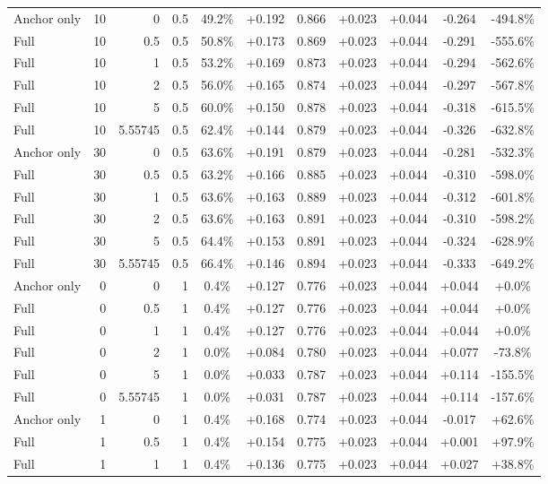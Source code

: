 \begin{table}[htbp]
\begin{tabular}{lrrrccccccc}
Anchor only & 10 & 0 & 0.5 & 49.2\% & +0.192 & 0.866 & +0.023 & +0.044 & -0.264 & -494.8\% \\
Full & 10 & 0.5 & 0.5 & 50.8\% & +0.173 & 0.869 & +0.023 & +0.044 & -0.291 & -555.6\% \\
Full & 10 & 1 & 0.5 & 53.2\% & +0.169 & 0.873 & +0.023 & +0.044 & -0.294 & -562.6\% \\
Full & 10 & 2 & 0.5 & 56.0\% & +0.165 & 0.874 & +0.023 & +0.044 & -0.297 & -567.8\% \\
Full & 10 & 5 & 0.5 & 60.0\% & +0.150 & 0.878 & +0.023 & +0.044 & -0.318 & -615.5\% \\
Full & 10 & 5.55745 & 0.5 & 62.4\% & +0.144 & 0.879 & +0.023 & +0.044 & -0.326 & -632.8\% \\
Anchor only & 30 & 0 & 0.5 & 63.6\% & +0.191 & 0.879 & +0.023 & +0.044 & -0.281 & -532.3\% \\
Full & 30 & 0.5 & 0.5 & 63.2\% & +0.166 & 0.885 & +0.023 & +0.044 & -0.310 & -598.0\% \\
Full & 30 & 1 & 0.5 & 63.6\% & +0.163 & 0.889 & +0.023 & +0.044 & -0.312 & -601.8\% \\
Full & 30 & 2 & 0.5 & 63.6\% & +0.163 & 0.891 & +0.023 & +0.044 & -0.310 & -598.2\% \\
Full & 30 & 5 & 0.5 & 64.4\% & +0.153 & 0.891 & +0.023 & +0.044 & -0.324 & -628.9\% \\
Full & 30 & 5.55745 & 0.5 & 66.4\% & +0.146 & 0.894 & +0.023 & +0.044 & -0.333 & -649.2\% \\
Anchor only & 0 & 0 & 1 & 0.4\% & +0.127 & 0.776 & +0.023 & +0.044 & +0.044 & +0.0\% \\
Full & 0 & 0.5 & 1 & 0.4\% & +0.127 & 0.776 & +0.023 & +0.044 & +0.044 & +0.0\% \\
Full & 0 & 1 & 1 & 0.4\% & +0.127 & 0.776 & +0.023 & +0.044 & +0.044 & +0.0\% \\
Full & 0 & 2 & 1 & 0.0\% & +0.084 & 0.780 & +0.023 & +0.044 & +0.077 & -73.8\% \\
Full & 0 & 5 & 1 & 0.0\% & +0.033 & 0.787 & +0.023 & +0.044 & +0.114 & -155.5\% \\
Full & 0 & 5.55745 & 1 & 0.0\% & +0.031 & 0.787 & +0.023 & +0.044 & +0.114 & -157.6\% \\
Anchor only & 1 & 0 & 1 & 0.4\% & +0.168 & 0.774 & +0.023 & +0.044 & -0.017 & +62.6\% \\
Full & 1 & 0.5 & 1 & 0.4\% & +0.154 & 0.775 & +0.023 & +0.044 & +0.001 & +97.9\% \\
Full & 1 & 1 & 1 & 0.4\% & +0.136 & 0.775 & +0.023 & +0.044 & +0.027 & +38.8\% \\

\end{tabular}
\end{table}
